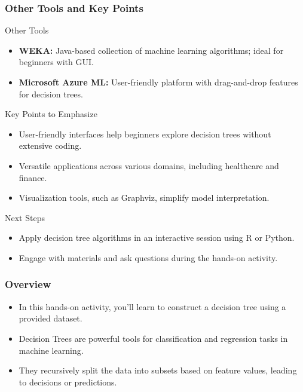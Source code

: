 \documentclass[aspectratio=169]{beamer}
\begin{document}
\begin{frame}
    \frametitle{Other Tools and Key Points}
    \begin{block}{Other Tools}
        \begin{itemize}
            \item \textbf{WEKA:} Java-based collection of machine learning algorithms; ideal for beginners with GUI.
            \item \textbf{Microsoft Azure ML:} User-friendly platform with drag-and-drop features for decision trees.
        \end{itemize}
    \end{block}
    \begin{block}{Key Points to Emphasize}
        \begin{itemize}
            \item User-friendly interfaces help beginners explore decision trees without extensive coding.
            \item Versatile applications across various domains, including healthcare and finance.
            \item Visualization tools, such as Graphviz, simplify model interpretation.
        \end{itemize}
    \end{block}
    \begin{block}{Next Steps}
        \begin{itemize}
            \item Apply decision tree algorithms in an interactive session using R or Python.
            \item Engage with materials and ask questions during the hands-on activity.
        \end{itemize}
    \end{block}
\end{frame}

\begin{frame}
    \titlepage
\end{frame}

\begin{frame}
    \frametitle{Overview}
    \begin{itemize}
        \item In this hands-on activity, you'll learn to construct a decision tree using a provided dataset.
        \item Decision Trees are powerful tools for classification and regression tasks in machine learning.
        \item They recursively split the data into subsets based on feature values, leading to decisions or predictions.
    \end{itemize}
\end{frame}
\end{document}
